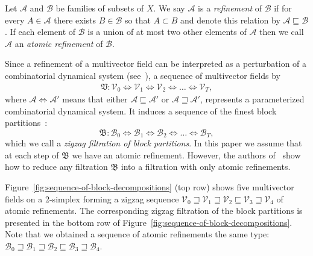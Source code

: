 \documentclass[letterpaper,11pt]{article}
\theoremstyle{plain}
\theoremstyle{definition}
\def\cA{\text{$\mathcal A$}}
\def\cB{\text{$\mathcal B$}}
\def\cV{\text{$\mathcal V$}}
\newcounter{li}
\newcommand{\inscr}{\sqsubseteq}
\newcommand{\ovscr}{\sqsupseteq}
\newcommand{\inovscr}{\Longleftrightarrow}
\newcommand{\BD}{\cB}
\newcommand{\zzBD}{\mathfrak{B}}
\newcommand{\zzV}{\mathfrak{V}}
\newcommand\michal[1]{\textcolor{ForestGreen}{[ML: #1]}}
\begin{document}
Let $\cA$ and $\cB$ be families of subsets of $X$.
We say $\cA$ is a \emph{refinement} of $\cB$ if for every $A\in\cA$ there exists $B\in\cB$ so that $A\subset B$ and
denote this relation by $\cA\sqsubseteq\cB$.
If each element of $\cB$ is a union of at most two other elements of $\cA$ then we call $\cA$ an \emph{atomic refinement} of $\cB$.

Since a refinement of a multivector field can be interpreted as a perturbation of a combinatorial dynamical system (see~\cite[Section~4.4]{CMbarcodes2025}), 
a sequence of multivector fields by
\begin{align}\label{eq:sequence-of-multivector-fields}
    \zzV: \cV_0 \inovscr \cV_1 \inovscr \cV_2 \inovscr \ldots \inovscr \cV_T,
\end{align}
where $\cA \inovscr \cA'$ means that either $\cA\inscr\cA'$ or $\cA\ovscr\cA'$, 
    represents a parameterized combinatorial dynamical system.
It induces a sequence of the finest block partitions~\cite[Proposition~5.2]{CMbarcodes2025}:
\begin{equation}\label{eq:BD_zigzag_filtration}
    \zzBD: \BD_0 \inovscr \BD_1 \inovscr \BD_2 \inovscr \ldots \inovscr \BD_T,
\end{equation}
which we call a \emph{zigzag filtration of block partitions}.
In this paper we assume that at each step of $\zzBD$ we have an atomic refinement. 
However, the authors of~\cite{CMbarcodes2025} show how to reduce any filtration $\zzBD$ into a filtration with only atomic refinements.

Figure~\ref{fig:sequence-of-block-decompositions} (top row) shows five multivector fields on a 2-simplex forming a zigzag sequence 
    $\cV_0\ovscr\cV_1\ovscr\cV_2\inscr\cV_3\ovscr\cV_4$ of atomic refinements. 
The corresponding zigzag filtration of the block partitions is presented in the bottom row of Figure~\ref{fig:sequence-of-block-decompositions}. 
Note that we obtained a sequence of atomic refinements the same type: 
$\cB_0\ovscr\cB_1\ovscr\cB_2\inscr\cB_3\ovscr\cB_4$.
    
\end{document}
